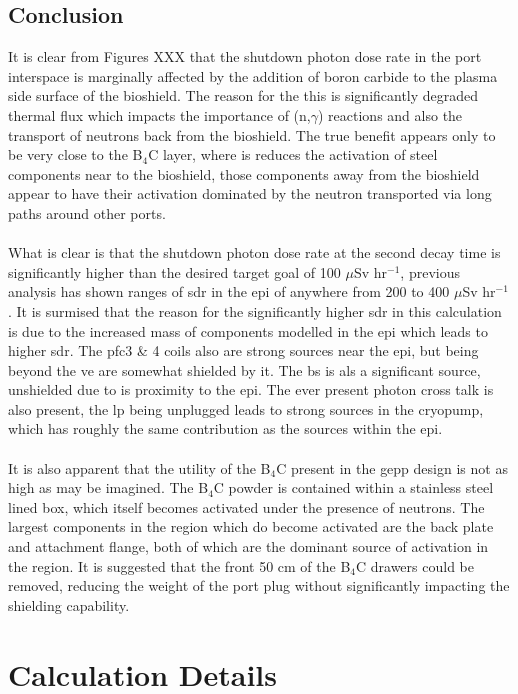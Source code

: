 \documentclass[12pt]{article}
\begin{document}
\subsection{Conclusion}
It is clear from Figures XXX that the shutdown photon dose rate in the port
interspace is marginally affected by the addition of boron carbide to the
plasma side surface of the bioshield. The reason for the this is significantly
degraded thermal flux which impacts the importance of (n,$\gamma$) reactions
and also the transport of neutrons back from the bioshield. The true benefit
appears only to be very close to the B$_4$C layer, where is reduces the
activation of steel components near to the bioshield, those components away
from the bioshield appear to have their activation dominated by the neutron
transported via long paths around other ports. 
\\
\\
What is clear is that the shutdown photon dose rate at the second decay time is
significantly higher than the desired target goal of 100 $\mu$Sv hr$^{-1}$,
previous analysis has shown ranges of \gls{sdr} in the \gls{epi} of anywhere
from 200 to 400 $\mu$Sv hr$^{-1}$. It is surmised that the reason for the
significantly higher \gls{sdr} in this calculation is due to the increased
mass of components modelled in the \gls{epi} which leads to higher \gls{sdr}.
The \gls{pfc}3 \& 4 coils also are strong sources near the \gls{epi}, but being
beyond the \gls{ve} are somewhat shielded by it. The \gls{bs} is als a
significant source, unshielded due to is proximity to the \gls{epi}. The ever
present photon cross talk is also present, the \gls{lp} being unplugged leads
to strong sources in the cryopump, which has roughly the same contribution
as the sources within the \gls{epi}.
\\
\\
It is also apparent that the utility of the B$_4$C present in the \gls{gepp}
design is not as high as may be imagined. The B$_4$C powder is contained within
a stainless steel lined box, which itself becomes activated under the presence
of neutrons. The largest components in the region which do become activated are
the back plate and attachment flange, both of which are the dominant source of
activation in the region. It is suggested that the front 50 cm of the B$_4$C
drawers could be removed, reducing the weight of the port plug without
significantly impacting the shielding capability.
\newpage
\clearpage
\section{Calculation Details}
\end{document}
